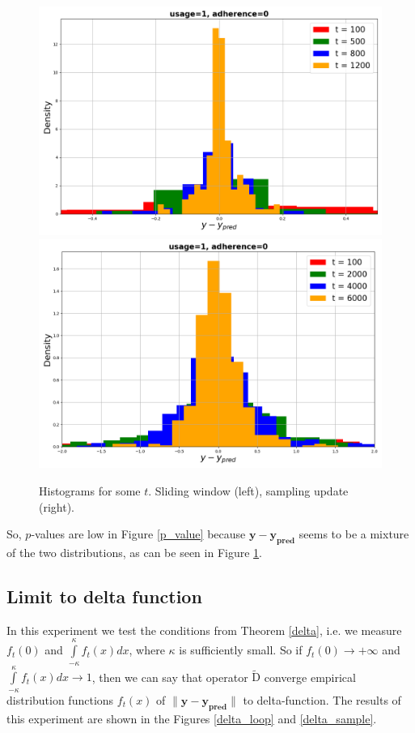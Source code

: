 \documentclass{article}
\begin{document}
        \begin{figure}[h!]
            \centering
            \includegraphics[width=0.49\linewidth]{pictures/hist_loop_1_0.png}
            \includegraphics[width=0.49\linewidth]{pictures/hist_sample_1_0.png}
            
            \caption{Histograms for some $t$. Sliding window (left), sampling update (right).}
            \label{hist}
        \end{figure}

        So, $p$-values are low in Figure \ref{p_value} because $\mathbf{y} - \mathbf{y_{\text{pred}}}$ seems to be a mixture of the two distributions, as can be seen in Figure \ref{hist}.

    \subsection{Limit to delta function} \label{exp_3}
        In this experiment we test the conditions from Theorem \ref{delta}, i.e. we measure $f_t(0)$ and $\int\limits_{-\kappa}^{\kappa}f_t(x)dx$, where $\kappa$ is sufficiently small. So if $f_t(0) \to +\infty$ and $\int\limits_{-\kappa}^{\kappa}f_t(x)dx \to 1$, then we can say that operator $\widetilde{\text{D}}$ converge empirical distribution functions $f_t(x)$ of $\|\mathbf{y} - \mathbf{y_{\text{pred}}}\|$ to delta-function. The results of this experiment are shown in the Figures \ref{delta_loop} and \ref{delta_sample}.
\end{document}
